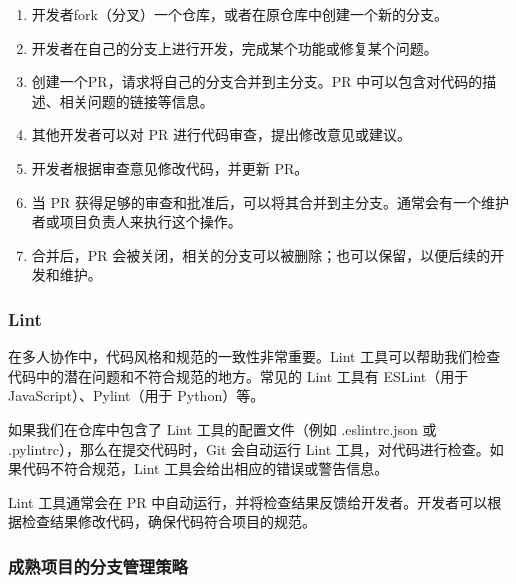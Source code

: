 \documentclass[../main.tex]{subfiles}
\begin{document}
\begin{enumerate}
  \item 开发者fork（分叉）一个仓库，或者在原仓库中创建一个新的分支。
  \item 开发者在自己的分支上进行开发，完成某个功能或修复某个问题。
  \item 创建一个PR，请求将自己的分支合并到主分支。PR 中可以包含对代码的描述、相关问题的链接等信息。
  \item 其他开发者可以对 PR 进行代码审查，提出修改意见或建议。
  \item 开发者根据审查意见修改代码，并更新 PR。
  \item 当 PR 获得足够的审查和批准后，可以将其合并到主分支。通常会有一个维护者或项目负责人来执行这个操作。
  \item 合并后，PR 会被关闭，相关的分支可以被删除；也可以保留，以便后续的开发和维护。
\end{enumerate}

\subsubsection{Lint}

在多人协作中，代码风格和规范的一致性非常重要。Lint 工具可以帮助我们检查代码中的潜在问题和不符合规范的地方。常见的 Lint 工具有 ESLint（用于 JavaScript）、Pylint（用于 Python）等。

如果我们在仓库中包含了 Lint 工具的配置文件（例如 .eslintrc.json 或 .pylintrc），那么在提交代码时，Git 会自动运行 Lint 工具，对代码进行检查。如果代码不符合规范，Lint 工具会给出相应的错误或警告信息。

Lint 工具通常会在 PR 中自动运行，并将检查结果反馈给开发者。开发者可以根据检查结果修改代码，确保代码符合项目的规范。

\subsubsection{成熟项目的分支管理策略}
\end{document}
